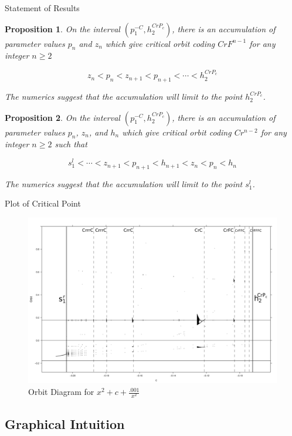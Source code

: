 \documentclass{beamer}
\newtheorem{proposition}{\bf Proposition}
\newcommand{\<}{\left\langle}
\renewcommand{\>}{\right\rangle} %
\renewcommand{\*}{\cdot} %
\newcommand{\pl}{p^{-C}_1}
\newcommand{\pr}{h^{CrP_c}_2}
\begin{document}
\begin{frame}[allowframebreaks]{Statement of Results}
	\begin{proposition}
		On the interval $ (\pl, \pr)$, there is an accumulation of parameter values $p_n$ and $z_n$ which give critical orbit coding $CrF^{n-1}$ for any integer $n \geq 2$

		{\normalsize
		\[
		z_n < p_n < z_{n+1} < p_{n+1} < \cdots < h_2^{CrP_c}
		\]}

		The numerics suggest that the accumulation will limit to the point $h_2^{CrP_c}$.
	\end{proposition}
	\begin{proposition}
		On the interval $ (\pl, \pr)$, there is an accumulation of parameter values $p_n$, $z_n$, and $h_n$ which give critical orbit coding $Cr^{n-2}$ for any integer $n \geq 2$ such that

		{\normalsize 
		\[
		s^l_1 < \cdots < z_{n+1} < p_{n+1} < h_{n+1} < z_n < p_n < h_n
		\]}

		The numerics suggest that the accumulation will limit to the point $s^l_1$.
	\end{proposition}
\end{frame}


\begin{frame}{Plot of Critical Point}
	\begin{figure}
		\centering
		\includegraphics[width=.8\textwidth]{./img/over.png}
		\caption{Orbit Diagram for $x^2 + c + \frac{.001}{x^2}$}
	\end{figure}
\end{frame}



\subsection{Graphical Intuition}
\end{document}
